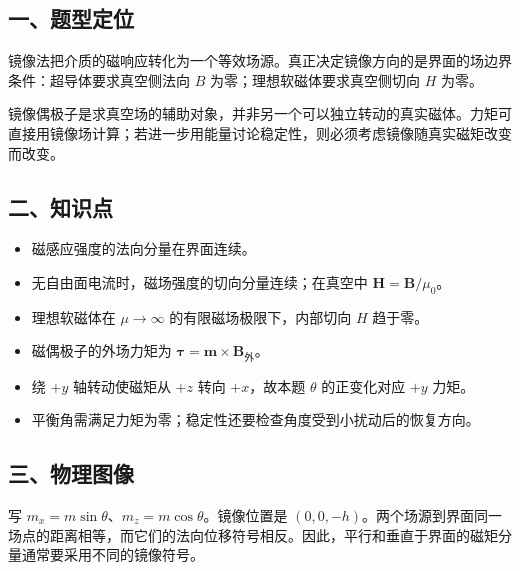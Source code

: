 \documentclass[12pt,a4paper,fontset=fandol]{ctexart}
\providecommand{\tightlist}{\setlength{\itemsep}{0pt}\setlength{\parskip}{0pt}}
\begin{document}
\subsection{一、题型定位}\label{ux4e00ux9898ux578bux5b9aux4f4d-2}

镜像法把介质的磁响应转化为一个等效场源。真正决定镜像方向的是界面的场边界条件：超导体要求真空侧法向
\(B\) 为零；理想软磁体要求真空侧切向 \(H\) 为零。

镜像偶极子是求真空场的辅助对象，并非另一个可以独立转动的真实磁体。力矩可直接用镜像场计算；若进一步用能量讨论稳定性，则必须考虑镜像随真实磁矩改变而改变。

\subsection{二、知识点}\label{ux4e8cux77e5ux8bc6ux70b9-2}

\begin{itemize}
\tightlist
\item
  磁感应强度的法向分量在界面连续。
\item
  无自由面电流时，磁场强度的切向分量连续；在真空中
  \(\boldsymbol H=\boldsymbol B/\mu_0\)。
\item
  理想软磁体在 \(\mu\to\infty\) 的有限磁场极限下，内部切向 \(H\)
  趋于零。
\item
  磁偶极子的外场力矩为
  \(\boldsymbol\tau=\boldsymbol m\times\boldsymbol B_{\text{外}}\)。
\item
  绕 \(+y\) 轴转动使磁矩从 \(+z\) 转向 \(+x\)，故本题 \(\theta\)
  的正变化对应 \(+y\) 力矩。
\item
  平衡角需满足力矩为零；稳定性还要检查角度受到小扰动后的恢复方向。
\end{itemize}

\subsection{三、物理图像}\label{ux4e09ux7269ux7406ux56feux50cf-2}

写 \(m_x=m\sin\theta\)、\(m_z=m\cos\theta\)。镜像位置是
\((0,0,-h)\)。两个场源到界面同一场点的距离相等，而它们的法向位移符号相反。因此，平行和垂直于界面的磁矩分量通常要采用不同的镜像符号。
\end{document}
